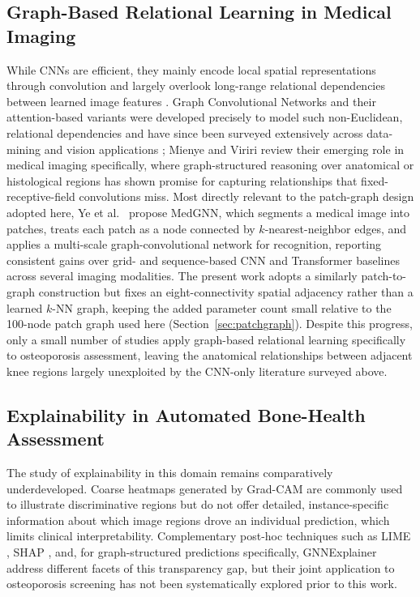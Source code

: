 \documentclass[conference]{IEEEtran}
\begin{document}
\subsection{Graph-Based Relational Learning in Medical Imaging}
While CNNs are efficient, they mainly encode local spatial representations through convolution and largely overlook long-range relational dependencies between learned image features \cite{Amani2024, Sarhan2024}. Graph Convolutional Networks \cite{kipf2017semisupervised} and their attention-based variants \cite{velickovic2018graph} were developed precisely to model such non-Euclidean, relational dependencies and have since been surveyed extensively across data-mining and vision applications \cite{wu2021comprehensive}; Mienye and Viriri \cite{mienye2025graph} review their emerging role in medical imaging specifically, where graph-structured reasoning over anatomical or histological regions has shown promise for capturing relationships that fixed-receptive-field convolutions miss. Most directly relevant to the patch-graph design adopted here, Ye et al.\ \cite{ye2026medgnn} propose MedGNN, which segments a medical image into patches, treats each patch as a node connected by $k$-nearest-neighbor edges, and applies a multi-scale graph-convolutional network for recognition, reporting consistent gains over grid- and sequence-based CNN and Transformer baselines across several imaging modalities. The present work adopts a similarly patch-to-graph construction but fixes an eight-connectivity spatial adjacency rather than a learned $k$-NN graph, keeping the added parameter count small relative to the 100-node patch graph used here (Section~\ref{sec:patchgraph}). Despite this progress, only a small number of studies apply graph-based relational learning specifically to osteoporosis assessment, leaving the anatomical relationships between adjacent knee regions largely unexploited by the CNN-only literature surveyed above.

\subsection{Explainability in Automated Bone-Health Assessment}
The study of explainability in this domain remains comparatively underdeveloped. Coarse heatmaps generated by Grad-CAM \cite{gradcam} are commonly used to illustrate discriminative regions \cite{sukegawa2022identification, Chen2024} but do not offer detailed, instance-specific information about which image regions drove an individual prediction, which limits clinical interpretability. Complementary post-hoc techniques such as LIME \cite{lime}, SHAP \cite{lundberg2017unified}, and, for graph-structured predictions specifically, GNNExplainer \cite{ying2019gnnexplainer} address different facets of this transparency gap, but their joint application to osteoporosis screening has not been systematically explored prior to this work.
\end{document}
